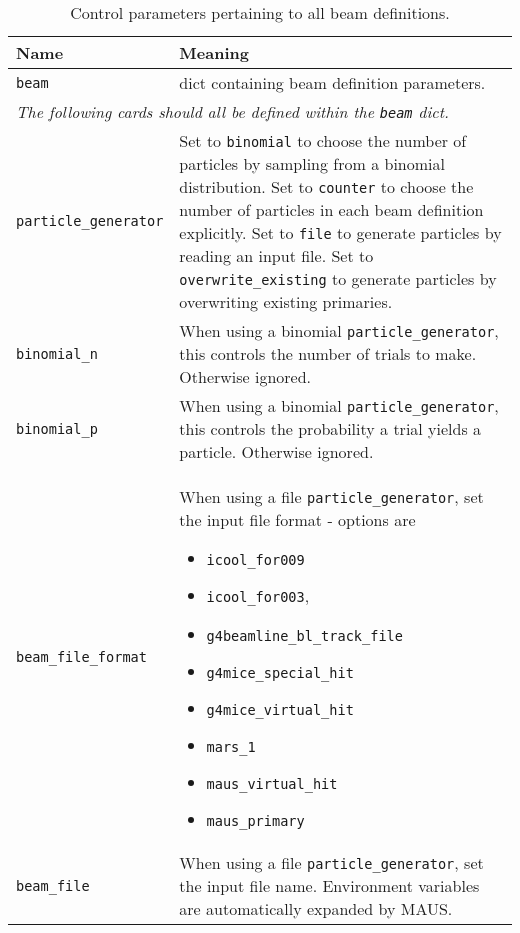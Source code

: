 \begin{table*}
\begin{center}
\caption{Control parameters pertaining to all beam definitions.}
\begin{tabularx}{\textwidth}{lX}
Name & Meaning \\
\hline
\verb|beam| & dict containing beam definition parameters.\\
\hline
\multicolumn{2}{l}{\emph{The following cards should all be defined within the \verb|beam| dict.}} \\
\hline
\verb|particle_generator| & Set to \verb|binomial| to choose the number of particles by sampling from a binomial distribution. Set to \verb|counter| to choose the number of particles in each beam definition explicitly. Set to \verb|file| to generate particles by reading an input file. Set to \verb|overwrite_existing| to generate particles by overwriting existing primaries. \\
\verb|binomial_n| & When using a binomial \verb|particle_generator|, this controls the number of trials to make. Otherwise ignored. \\
\verb|binomial_p| & When using a binomial \verb|particle_generator|, this controls the probability a trial yields a particle. Otherwise ignored. \\
\verb|beam_file_format| & When using a file \verb|particle_generator|, set the input file format - options are 
                          \begin{itemize}
                            \setlength{\itemsep}{0mm}
                            \item \verb|icool_for009|
                            \item \verb|icool_for003|,
                            \item \verb|g4beamline_bl_track_file|
                            \item \verb|g4mice_special_hit|
                            \item \verb|g4mice_virtual_hit|
                            \item  \verb|mars_1|
                            \item \verb|maus_virtual_hit|
                            \item \verb|maus_primary|
                          \end{itemize}\\
\verb|beam_file|&  When using a file \verb|particle_generator|, set the input file name. Environment variables are automatically expanded by MAUS.\\

\end{tabularx}
\end{center}
\end{table*}

